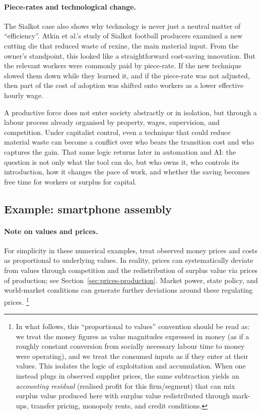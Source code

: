 \paragraph{Piece-rates and technological change.}
The Sialkot case also shows why technology is never just a neutral matter of
``efficiency''. Atkin et al.'s study of Sialkot football producers examined a new
cutting die that reduced waste of rexine, the main material input. From the
owner's standpoint, this looked like a straightforward cost-saving innovation.
But the relevant workers were commonly paid by piece-rate. If the new technique
slowed them down while they learned it, and if the piece-rate was not adjusted,
then part of the cost of adoption was shifted onto workers as a lower effective
hourly wage.\cite{AtkinEtAl2017}

A productive force does not
enter society abstractly or in isolation, but through a labour process already organised
by property, wages, supervision, and competition. Under capitalist control, even
a technique that could reduce material waste can become a conflict over who bears
the transition cost and who captures the gain. That same logic returns later in
automation and AI: the question is not only what the tool can do, but who owns it,
who controls its introduction, how it changes the pace of work, and whether the
saving becomes free time for workers or surplus for capital.

\subsection{Example: smartphone assembly}

\paragraph{Note on values and prices.}
For simplicity in these numerical examples, treat observed money prices and costs as
proportional to underlying values. In reality, prices can systematically deviate from
values through competition and the redistribution of surplus value via prices of
production; see Section~\ref{sec:prices-production}. Market power, state policy, and
world-market conditions can generate further deviations around these regulating prices.
\footnote{In what follows, this ``proportional to values'' convention should be read as: we treat the money figures as value magnitudes expressed in money (as if a roughly constant conversion from socially necessary labour time to money were operating), and we treat the consumed inputs as if they enter at their values. This isolates the logic of exploitation and accumulation. When one instead plugs in observed supplier prices, the same subtraction yields an \emph{accounting residual} (realised profit for this firm/segment) that can mix surplus value produced here with surplus value redistributed through mark-ups, transfer pricing, monopoly rents, and credit conditions.}

